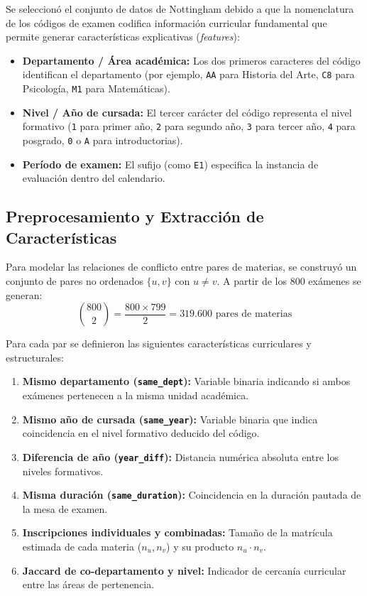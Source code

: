 \documentclass[11pt,a4paper]{article}
\begin{document}
Se seleccionó el conjunto de datos de Nottingham debido a que la nomenclatura de los códigos de examen codifica información curricular fundamental que permite generar características explicativas (\textit{features}):
\begin{itemize}
    \item \textbf{Departamento / Área académica:} Los dos primeros caracteres del código identifican el departamento (por ejemplo, \texttt{AA} para Historia del Arte, \texttt{C8} para Psicología, \texttt{M1} para Matemáticas).
    \item \textbf{Nivel / Año de cursada:} El tercer carácter del código representa el nivel formativo (\texttt{1} para primer año, \texttt{2} para segundo año, \texttt{3} para tercer año, \texttt{4} para posgrado, \texttt{0} o \texttt{A} para introductorias).
    \item \textbf{Período de examen:} El sufijo (como \texttt{E1}) especifica la instancia de evaluación dentro del calendario.
\end{itemize}

\subsection{Preprocesamiento y Extracción de Características}
Para modelar las relaciones de conflicto entre pares de materias, se construyó un conjunto de pares no ordenados $\{u, v\}$ con $u \neq v$. A partir de los 800 exámenes se generan:
\begin{equation}
    \binom{800}{2} = \frac{800 \times 799}{2} = 319.600 \text{ pares de materias}
\end{equation}

Para cada par se definieron las siguientes características curriculares y estructurales:
\begin{enumerate}
    \item \textbf{Mismo departamento (\texttt{same\_dept}):} Variable binaria indicando si ambos exámenes pertenecen a la misma unidad académica.
    \item \textbf{Mismo año de cursada (\texttt{same\_year}):} Variable binaria que indica coincidencia en el nivel formativo deducido del código.
    \item \textbf{Diferencia de año (\texttt{year\_diff}):} Distancia numérica absoluta entre los niveles formativos.
    \item \textbf{Misma duración (\texttt{same\_duration}):} Coincidencia en la duración pautada de la mesa de examen.
    \item \textbf{Inscripciones individuales y combinadas:} Tamaño de la matrícula estimada de cada materia ($n_u, n_v$) y su producto $n_u \cdot n_v$.
    \item \textbf{Jaccard de co-departamento y nivel:} Indicador de cercanía curricular entre las áreas de pertenencia.
\end{enumerate}
\end{document}
